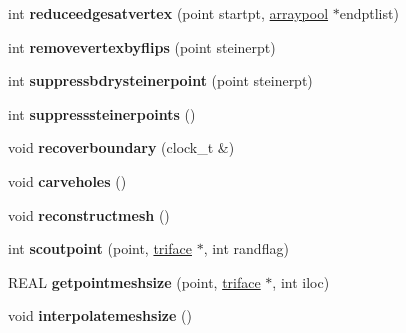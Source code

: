 \begin{DoxyCompactItemize}
\item 
\hypertarget{classtetgenmesh_af61e64f6536238f25296f3f26b360935}{int {\bfseries reduceedgesatvertex} (point startpt, \hyperlink{classtetgenmesh_1_1arraypool}{arraypool} $\ast$endptlist)}\label{classtetgenmesh_af61e64f6536238f25296f3f26b360935}

\item 
\hypertarget{classtetgenmesh_ad3277eea82fb5eb134c5eaa6abf5c18d}{int {\bfseries removevertexbyflips} (point steinerpt)}\label{classtetgenmesh_ad3277eea82fb5eb134c5eaa6abf5c18d}

\item 
\hypertarget{classtetgenmesh_aae5530d808e30771e717c94cb8586f0b}{int {\bfseries suppressbdrysteinerpoint} (point steinerpt)}\label{classtetgenmesh_aae5530d808e30771e717c94cb8586f0b}

\item 
\hypertarget{classtetgenmesh_affc448708b6df2b57048544d3efd6e3c}{int {\bfseries suppresssteinerpoints} ()}\label{classtetgenmesh_affc448708b6df2b57048544d3efd6e3c}

\item 
\hypertarget{classtetgenmesh_a1be7dce56688fbe7a97fc31f98b61c19}{void {\bfseries recoverboundary} (clock\-\_\-t \&)}\label{classtetgenmesh_a1be7dce56688fbe7a97fc31f98b61c19}

\item 
\hypertarget{classtetgenmesh_ad71017c71bd2cac0232c410a651ed085}{void {\bfseries carveholes} ()}\label{classtetgenmesh_ad71017c71bd2cac0232c410a651ed085}

\item 
\hypertarget{classtetgenmesh_ad44b2ea3720da385a0cbcf306884e126}{void {\bfseries reconstructmesh} ()}\label{classtetgenmesh_ad44b2ea3720da385a0cbcf306884e126}

\item 
\hypertarget{classtetgenmesh_a230d03da7e72e7092f5f51886806dd9b}{int {\bfseries scoutpoint} (point, \hyperlink{classtetgenmesh_1_1triface}{triface} $\ast$, int randflag)}\label{classtetgenmesh_a230d03da7e72e7092f5f51886806dd9b}

\item 
\hypertarget{classtetgenmesh_a88f9f3b6bb6fb16418d028dd7d920ad0}{R\-E\-A\-L {\bfseries getpointmeshsize} (point, \hyperlink{classtetgenmesh_1_1triface}{triface} $\ast$, int iloc)}\label{classtetgenmesh_a88f9f3b6bb6fb16418d028dd7d920ad0}

\item 
\hypertarget{classtetgenmesh_a78dbc1dcd69c15ee0f7f226be1078008}{void {\bfseries interpolatemeshsize} ()}\label{classtetgenmesh_a78dbc1dcd69c15ee0f7f226be1078008}


\end{DoxyCompactItemize}
